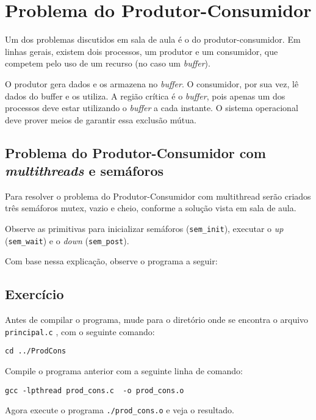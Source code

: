 \chapter{Problema do Produtor-Consumidor}
Um dos problemas discutidos em sala de aula é o do produtor-consumidor. Em linhas gerais, existem dois processos, um produtor e um consumidor, que competem pelo uso de um recurso (no caso um \textit{buffer}).

O produtor gera dados e os armazena no \textit{buffer}. O consumidor, por sua vez, lê dados do buffer e os utiliza. A região crítica é o \textit{buffer}, pois apenas um dos processos deve estar utilizando o \textit{buffer} a cada instante. O sistema operacional deve prover meios de garantir essa exclusão mútua.


\section{Problema do Produtor-Consumidor com \textit{multithreads} e semáforos}
Para resolver o problema do Produtor-Consumidor com multithread serão criados três semáforos mutex, vazio e cheio, conforme a solução vista em sala de aula.

Observe as primitivas para inicializar semáforos (\texttt{sem\_init}), executar o \textit{up} (\texttt{sem\_wait}) e o \textit{down} (\texttt{sem\_post}).

Com base nessa explicação, observe o programa a seguir: 


\section{Exercício}
Antes de compilar o programa, mude para o diretório onde se encontra o arquivo \texttt{principal.c} , com o seguinte comando:

\begin{lstlisting}[style=MyBashStyle]
cd ../ProdCons
\end{lstlisting}

Compile o programa anterior com a seguinte linha de comando:

\begin{lstlisting}[style=MyBashStyle]
gcc -lpthread prod_cons.c  -o prod_cons.o
\end{lstlisting}

Agora execute o programa \texttt{./prod\_cons.o} e veja o resultado.